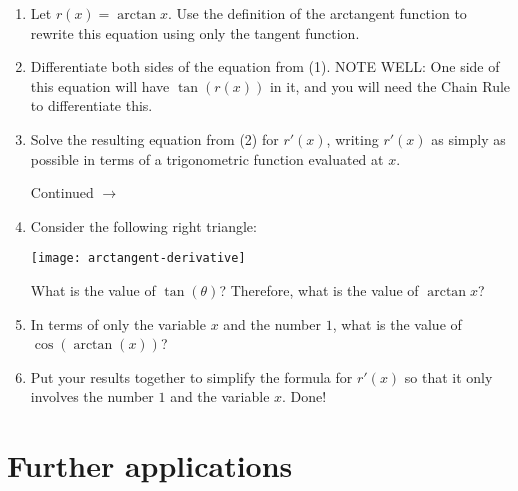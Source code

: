 \documentclass[11pt]{article}
\def\ra{\rightarrow}
\def\pageturn{\vfill 
\begin{flushright}
	\begin{small}
		Continued $\ra$
	\end{small}
\end{flushright} \newpage}
\begin{document}
\begin{enumerate}
	\item Let $r(x) = \arctan x$. Use the definition of the arctangent function to rewrite this equation using only the tangent function. 
	\vspace{0.5in}
	
	\item Differentiate both sides of the equation from (1). NOTE WELL: One side of this equation will have $\tan(r(x))$ in it, and you will need the Chain Rule to differentiate this. 
	\vspace{1in}
	
	\item Solve the resulting equation from (2) for $r'(x)$, writing $r'(x)$ as simply as possible in terms of a trigonometric function evaluated at $x$. 
	
	\pageturn
	
	\item Consider the following right triangle: 
	
		\texttt{[image: arctangent-derivative]}
	
	What is the value of $\tan(\theta)$? Therefore, what is the value of $\arctan x$? 
	\item In terms of only the variable $x$ and the number $1$, what is the value of $\cos(\arctan(x))$? 
	\vspace{1in}
	
	\item Put your results together to simplify the formula for $r'(x)$ so that it only involves the number $1$ and the variable $x$. Done! 
	\vspace{1in}
\end{enumerate}

\section{Further applications} 
\end{document}
